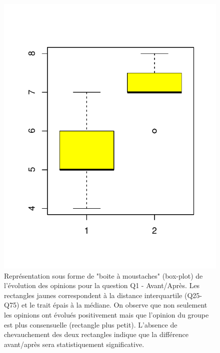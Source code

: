 \documentclass[12pt,english,french]{article}\usepackage{graphicx, color}
\makeatletter
\def\maxwidth{ %
  \ifdim\Gin@nat@width>\linewidth
    \linewidth
  \else
    \Gin@nat@width
  \fi
}
\newenvironment{knitrout}{}{} %
\makeatother
\begin{document}
\begin{figure}
\begin{center}
\begin{knitrout}
\color{fgcolor}
\includegraphics[width=\maxwidth]{figure/Q1_boxplot} 

\end{knitrout}

\end{center}
\caption{Représentation sous forme de "boite à moustaches" (box-plot) de l'évolution des opinions pour la question Q1 - Avant/Après. Les rectangles jaunes correspondent à la distance interquartile (Q25-Q75) et le trait épais à la médiane. On observe que non seulement les opinions ont évolués positivement mais que l'opinion du groupe est plus consensuelle (rectangle plus petit). L'absence de chevauchement des deux rectangles indique que la différence avant/après sera statistiquement significative.}
\label{Q1_box}
\end{figure}
\end{document}
